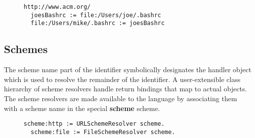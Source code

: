 \documentclass[preprint,authoryear]{acm_proc_article-sp}
\begin{document}

\begin{figure}[htbp]
\begin{lstlisting}[style=L,label=first-polymorphic-examples,caption=\emph{Polymorphic identifiers} in simple expressions.]
  http://www.acm.org/
  joesBashrc := file:/Users/joe/.bashrc
  file:/Users/mike/.bashrc := joesBashrc
\end{lstlisting}
\end{figure}

\subsection{Schemes}

The scheme name part of the identifier symbolically designates the handler object which 
is used to resolve the remainder of the identifier.   A user-extensible class hierarchy of
scheme resolvers handle 
return bindings that map to actual objects. The scheme resolvers are made available to the 
language by associating them with a scheme name in the special {\bf scheme} scheme.


\begin{figure}[htbp]
\begin{lstlisting}[style=L,label=scheme-scheme-http,caption=Adding the http and file schemes.]
  scheme:http := URLSchemeResolver scheme.
  scheme:file := FileSchemeResolver scheme.
\end{lstlisting}
\end{figure}
\end{document}
